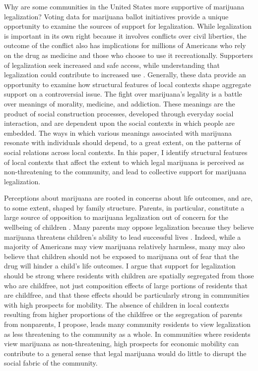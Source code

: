Why are some communities in the United States more supportive of marijuana legalization? Voting data for marijuana ballot initiatives provide a unique opportunity to examine the sources of support for legalization. While legalization is important in its own right because it involves conflicts over civil liberties, the outcome of the conflict also has implications for millions of Americans who rely on the drug as medicine and those who choose to use it recreationally. Supporters of legalization seek increased and safe access, while understanding that legalization could contribute to increased use \citep{ingraham_2017}. Generally, these data provide an opportunity to examine how structural features of local contexts shape aggregate support on a controversial issue. The fight over marijuana's legality is a battle over meanings of morality, medicine, and addiction. These meanings are the product of social construction processes, developed through everyday social interaction, and are dependent upon the social contexts in which people are embedded. The ways in which various meanings associated with marijuana resonate with individuals should depend, to a great extent, on the patterns of social relations across local contexts. In this paper, I identify structural features of local contexts that affect the extent to which legal marijuana is perceived as non-threatening to the community, and lead to collective support for marijuana legalization. 




Perceptions about marijuana are rooted in concerns about life outcomes, and are, to some extent, shaped by family structure. Parents, in particular, constitute a large source of opposition to marijuana legalization out of concern for the wellbeing of children \citep{elder_and_greene_2019,newhart_and_dolphin_2018,caulkins_et_al_2012,rosenthal_and_kubby_1996}. Many parents may oppose legalization because they believe marijuana threatens children's ability to lead successful lives \citep{elder_and_greene_2019,newhart_and_dolphin_2018,mosher_and_akins_2019,lynskey_and_hall_2000,kandel_et_al_1986,lifrak_et_al_1997,fergusson_et_al_2002,kandel_2002}. Indeed, while a majority of Americans may view marijuana relatively harmless, many may also believe that children should not be exposed to marijuana out of fear that the drug will hinder a child's life outcomes. I argue that support for legalization should be strong where residents with children are spatially segregated from those who are childfree, not just composition effects of large portions of residents that are childfree, and that these effects should be particularly strong in communities with high prospects for mobility. The absence of children in local contexts resulting from higher proportions of the childfree or the segregation of parents from nonparents, I propose, leads many community residents to view legalization as less threatening to the community as a whole. In communities where residents view marijuana as non-threatening, high prospects for economic mobility can contribute to a general sense that legal marijuana would do little to disrupt the social fabric of the community. 



